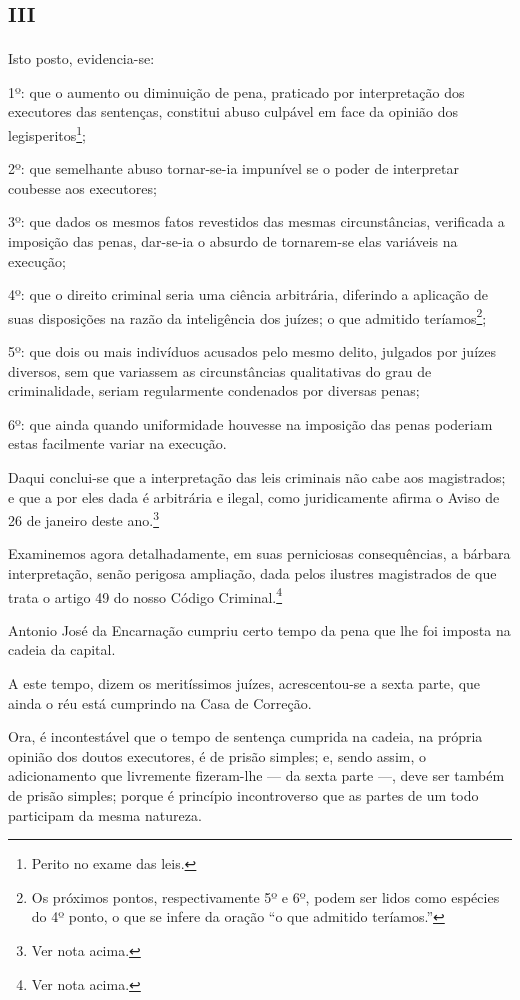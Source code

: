 \section{\textsc{iii}}

Isto posto, evidencia-se:

1º: que o aumento ou diminuição de pena, praticado por interpretação dos
executores das sentenças, constitui abuso culpável em face da opinião
dos legisperitos\footnote{Perito no exame das leis.};

2º: que semelhante abuso tornar-se-ia impunível se o poder de
interpretar coubesse aos executores;

3º: que dados os mesmos fatos revestidos das mesmas circunstâncias,
verificada a imposição das penas, dar-se-ia o absurdo de tornarem-se
elas variáveis na execução;

4º: que o direito criminal seria uma ciência arbitrária, diferindo a
aplicação de suas disposições na razão da inteligência dos juízes; o que
admitido teríamos\footnote{Os próximos pontos, respectivamente 5º e
  6º, podem ser lidos como espécies do 4º ponto, o que se infere da
  oração ``o que admitido teríamos.''};

5º: que dois ou mais indivíduos acusados pelo mesmo delito, julgados por
juízes diversos, sem que variassem as circunstâncias qualitativas do
grau de criminalidade, seriam regularmente condenados por diversas
penas;

6º: que ainda quando uniformidade houvesse na imposição das penas
poderiam estas facilmente variar na execução.

Daqui conclui-se que a interpretação das leis criminais não cabe aos
magistrados; e que a por eles dada é arbitrária e ilegal, como
juridicamente afirma o Aviso de 26 de janeiro deste ano.\footnote{Ver
  nota acima.}

Examinemos agora detalhadamente, em suas perniciosas consequências, a
bárbara interpretação, senão perigosa ampliação, dada pelos ilustres
magistrados de que trata o artigo 49 do nosso Código
Criminal.\footnote{Ver nota acima.}

Antonio José da Encarnação cumpriu certo tempo da pena que lhe foi
imposta na cadeia da capital.

A este tempo, dizem os meritíssimos juízes, acrescentou-se a sexta
parte, que ainda o réu está cumprindo na Casa de Correção.

Ora, é incontestável que o tempo de sentença cumprida na cadeia, na
própria opinião dos doutos executores, é de prisão simples; e, sendo
assim, o adicionamento que livremente fizeram-lhe --- da sexta parte ---,
deve ser também de prisão simples; porque é princípio incontroverso que
as partes de um todo participam da mesma natureza.

